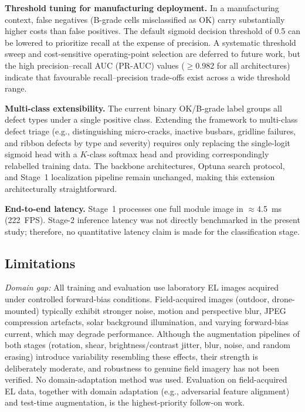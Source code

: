 \documentclass[conference]{IEEEtran}
\begin{document}
\textbf{Threshold tuning for manufacturing deployment.} In a manufacturing context, false negatives (B-grade cells misclassified as OK) carry substantially higher costs than false positives. The default sigmoid decision threshold of 0.5 can be lowered to prioritize recall at the expense of precision. A systematic threshold sweep and cost-sensitive operating-point selection are deferred to future work, but the high precision--recall AUC (PR-AUC) values ($\geq$0.982 for all architectures) indicate that favourable recall--precision trade-offs exist across a wide threshold range.

\textbf{Multi-class extensibility.} The current binary OK/B-grade label groups all defect types under a single positive class. Extending the framework to multi-class defect triage (e.g., distinguishing micro-cracks, inactive busbars, gridline failures, and ribbon defects by type and severity) requires only replacing the single-logit sigmoid head with a $K$-class softmax head and providing correspondingly relabelled training data. The backbone architectures, Optuna search protocol, and Stage~1 localization pipeline remain unchanged, making this extension architecturally straightforward.

\textbf{End-to-end latency.} Stage~1 processes one full module image in $\approx$4.5~ms (222~FPS). Stage-2 inference latency was not directly benchmarked in the present study; therefore, no quantitative latency claim is made for the classification stage.

\subsection{Limitations}

\textit{Domain gap:} All training and evaluation use laboratory EL images acquired under controlled forward-bias conditions. Field-acquired images (outdoor, drone-mounted) typically exhibit stronger noise, motion and perspective blur, JPEG compression artefacts, solar background illumination, and varying forward-bias current, which may degrade performance. Although the augmentation pipelines of both stages (rotation, shear, brightness/contrast jitter, blur, noise, and random erasing) introduce variability resembling these effects, their strength is deliberately moderate, and robustness to genuine field imagery has not been verified. No domain-adaptation method was used. Evaluation on field-acquired EL data, together with domain adaptation (e.g., adversarial feature alignment) and test-time augmentation, is the highest-priority follow-on work.
\end{document}
